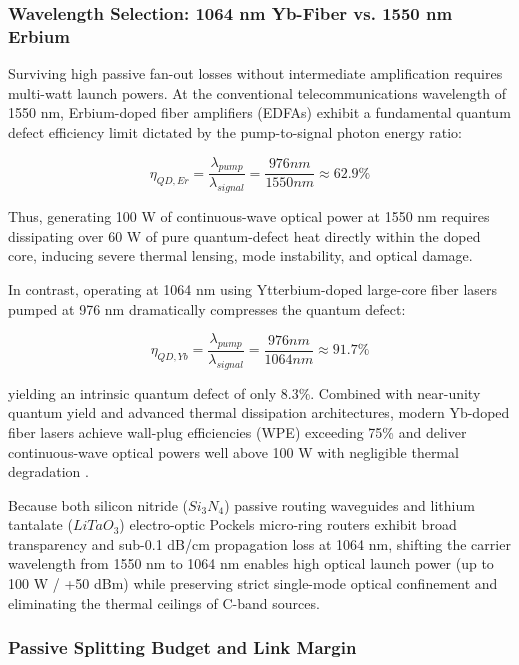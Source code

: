 \documentclass[journal]{IEEEtran}
\begin{document}
\subsubsection{\textbf{Wavelength Selection: 1064 nm Yb-Fiber vs. 1550 nm Erbium}}
Surviving high passive fan-out losses without intermediate amplification requires multi-watt launch powers. At the conventional telecommunications wavelength of 1550 nm, Erbium-doped fiber amplifiers (EDFAs) exhibit a fundamental quantum defect efficiency limit dictated by the pump-to-signal photon energy ratio:

\begin{equation}
\eta_{QD,Er} = \frac{\lambda_{pump}}{\lambda_{signal}}
= \frac{976 nm}{1550 nm} \approx 62.9 \%
\end{equation}

Thus, generating 100 W of continuous-wave optical power at 1550 nm requires dissipating over 60 W of pure quantum-defect heat directly within the doped core, inducing severe thermal lensing, mode instability, and optical damage.

In contrast, operating at 1064 nm using Ytterbium-doped large-core fiber lasers pumped at 976 nm dramatically compresses the quantum defect:

\begin{equation}
\eta_{QD,Yb} = \frac{\lambda_{pump}}{\lambda_{signal}}
= \frac{976 nm}{1064 nm} \approx 91.7\% 
\end{equation}

yielding an intrinsic quantum defect of only 8.3\%. Combined with near-unity quantum yield and advanced thermal dissipation architectures, modern Yb-doped fiber lasers achieve wall-plug efficiencies (WPE) exceeding 75\% and deliver continuous-wave optical powers well above 100 W with negligible thermal degradation \cite{Jeong2004}.

Because both silicon nitride ($Si_3N_4$) passive routing waveguides and lithium tantalate ($LiTaO_3$) electro-optic Pockels micro-ring routers exhibit broad transparency and sub-0.1 dB/cm propagation loss at 1064 nm, shifting the carrier wavelength from 1550 nm to 1064 nm enables high optical launch power (up to 100 W / +50 dBm) while preserving strict single-mode optical confinement and eliminating the thermal ceilings of C-band sources.

\subsubsection{\textbf{Passive Splitting Budget and Link Margin}}
\end{document}
